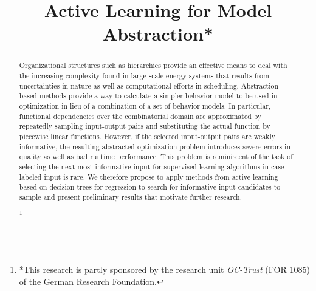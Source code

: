 \documentclass[conference]{IEEEtran}
\newcommand{\noteg}[1]{\sethlcolor{highlightgreen} \hl{\textbf{NOTE:} #1}}
\newcommand\blfootnote[1]{%
  \begingroup
  \renewcommand\thefootnote{}\footnote{#1}%
  \addtocounter{footnote}{-1}%
  \endgroup
}
\begin{document}
\title{Active Learning for Model Abstraction*}

\author{
}

\maketitle

\begin{abstract}
Organizational structures such as hierarchies provide an effective means to
deal with the increasing complexity found in large-scale energy systems that 
results from uncertainties in nature as well as computational efforts in scheduling. 
Abstraction-based methods provide a way to calculate a simpler behavior model 
to be used in optimization in lieu of a combination of a set of behavior models.
In particular, functional dependencies over the combinatorial domain 
are approximated by repeatedly sampling input-output pairs
and substituting the actual function by piecewise linear functions. However, if
the selected input-output pairs are weakly informative, the resulting abstracted
optimization problem introduces severe errors in quality as well as bad runtime performance.
This problem is reminiscent of the task of selecting the next most informative input for supervised learning
algorithms in case labeled input is rare.
We therefore propose to apply methods from active learning based on decision trees for regression
to search for informative
input candidates to sample and present preliminary results that motivate further research. 

\blfootnote{*This research is partly sponsored by the research unit \emph{OC-Trust} (FOR 1085) of the German Research Foundation.}
\end{abstract}

\end{document}
